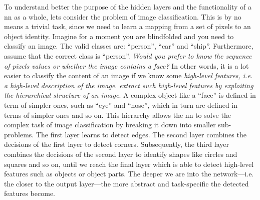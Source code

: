 To understand better the purpose of the hidden layers and the functionality of a
\gls{nn} as a whole, lets consider the problem of image
classification. This is by no means a trivial task,
since we need to learn a mapping from a set of pixels to an object identity.
Imagine for a moment you are blindfolded and you need to classify an image. The
valid classes are: ``person'', ``car'' and ``ship''. Furthermore, assume that
the correct class is ``person''. \emph{Would you prefer to know the
sequence of pixels values or whether the image contains a face?} In other words,
it is a lot easier to classify the content of an image if we know some
\emph{high-level features, i.e. a high-level description of the
image}. \emph{ extract such high-level
features by exploiting the hierarchical structure of an image}. A complex object
like a ``face'' is defined in term of simpler ones, such as ``eye'' and
``nose'', which in turn are defined in terms of simpler ones and so on. This
hierarchy allows the \gls{nn} to solve the complex task of image classification
by breaking it down into smaller sub-problems. The first layer learns to detect
edges. The second layer combines the decisions of the first layer to detect
corners. Subsequently, the third layer combines the decisions of the second
layer to identify shapes like circles and squares and so on, until we reach the
final layer which is able to detect high-level features such as objects or
object parts. The deeper we are into the network---i.e. the closer to the output
layer---the more abstract and task-specific the detected
features become.

